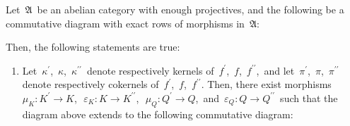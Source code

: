 
\begin{theorem}
\mbox{}
\vskip 0.15cm
\noindent
Let \,$\mathfrak{A}$\, be an abelian category with enough projectives, and
the following be a commutative diagram with exact rows of morphisms in \,$\mathfrak{A}$:
\begin{center}
\end{center}
Then, the following statements are true:
\begin{enumerate}
\item
	Let
	\,$\kappa^{\prime}$,\, $\kappa$,\, $\kappa^{\prime\prime}$\, 
	denote respectively kernels of
	\,$f^{\prime}$,\, $f$,\, $f^{\prime\prime}$,\,
	and let
	\,$\pi^{\prime}$,\, $\pi$,\, $\pi^{\prime\prime}$\, 
	denote  respectively cokernels of 
	\,$f^{\prime}$,\, $f$,\, $f^{\prime\prime}$.
	Then, there exist morphisms
	\,$\mu_{K} : K^{\prime} \longrightarrow K$,\,
	\,$\varepsilon_{K} : K \longrightarrow K^{\prime\prime}$,\,
	\,$\mu_{Q} : Q^{\prime} \longrightarrow Q$,\,
	and
	\,$\varepsilon_{Q} : Q \longrightarrow Q^{\prime\prime}$\,
	such that the diagram above extends to the following commutative diagram:
	\begin{center}
\end{center}
\end{enumerate}
\end{theorem}
